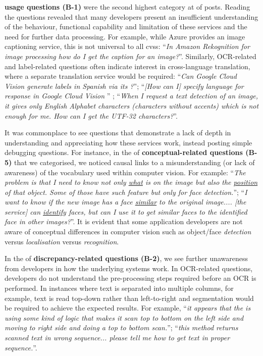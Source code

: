 %
\textbf{ usage questions (B-1)} were the second highest category at \PctTaxBAPIUsage{} of posts. Reading the questions revealed that many developers present an insufficient understanding of the behaviour, functional capability and limitation of these services and the need for further data processing. For example, while Azure provides an image captioning service, this is not universal to all \glspl{cvs}: ``\textit{In Amazon Rekognition for image processing how do I get the caption for an image?}''. Similarly, OCR-related and label-related questions often indicate interest in cross-language translation, where a separate translation service would be required: ``\textit{Can Google Cloud Vision generate labels in Spanish via its ?}''; ``\textit{[How can I] specify language for response in Google Cloud Vision }'' ; ``\textit{When I request a text detection of an image, it gives only English Alphabet characters (characters without accents) which is not enough for me. How can I get the UTF-32 characters?}''.

%
It was commonplace to see questions that demonstrate a lack of depth in understanding and appreciating how these services work, instead posting simple debugging questions. For instance, in the \PctTaxBConceptual{} of \textbf{conceptual-related questions (B-5)} that we categorised, we noticed causal links to a misunderstanding (or lack of awareness) of the vocabulary used within computer vision. For example: ``\textit{The problem is that I need to know not only \uline{what} is on the image but also the \uline{position} of that object. Some of those  have such feature but only for face detection.}''; ``\textit{I want to know if the new image has a face \uline{similar} to the original image.... [the service] can \uline{identify} faces, but can I use it to get similar faces to the identified face in other images?}''. It is evident that some application developers are not aware of conceptual differences in computer vision such as object/face \textit{detection} versus \textit{localisation} versus \textit{recognition}.

%
In the \PctTaxBDiscrepancy{} of \textbf{discrepancy-related questions (B-2)}, we see further unawareness from developers in how the underlying systems work. In OCR-related questions, developers do not understand the pre-processing steps required before an OCR is performed. In instances where text is separated into multiple columns, for example, text is read top-down rather than left-to-right and segmentation would be required to achieve the expected results. For example, ``\textit{it appears that the  is using some kind of logic that makes it scan top to bottom on the left side and moving to right side and doing a top to bottom scan.}''; ``\textit{this method returns scanned text in wrong sequence... please tell me how to get text in proper sequence.}''.


